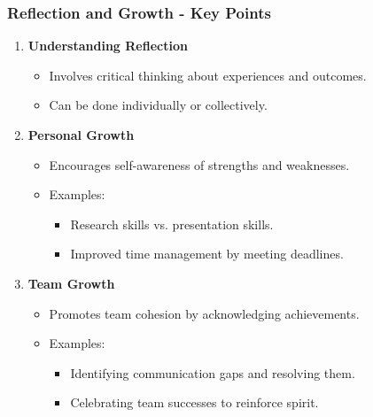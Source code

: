 \documentclass[aspectratio=169]{beamer}
\begin{document}
\begin{frame}[fragile]
    \frametitle{Reflection and Growth - Key Points}

    \begin{enumerate}
        \item \textbf{Understanding Reflection}
            \begin{itemize}
                \item Involves critical thinking about experiences and outcomes.
                \item Can be done individually or collectively.
            \end{itemize}

        \item \textbf{Personal Growth}
            \begin{itemize}
                \item Encourages self-awareness of strengths and weaknesses.
                \item Examples:
                    \begin{itemize}
                        \item Research skills vs. presentation skills.
                        \item Improved time management by meeting deadlines.
                    \end{itemize}
            \end{itemize}
        
        \item \textbf{Team Growth}
            \begin{itemize}
                \item Promotes team cohesion by acknowledging achievements.
                \item Examples:
                    \begin{itemize}
                        \item Identifying communication gaps and resolving them.
                        \item Celebrating team successes to reinforce spirit.
                    \end{itemize}
            \end{itemize}
    \end{enumerate}
\end{frame}
\end{document}
